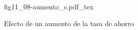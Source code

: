 \begin{figure}[h]
\centering
\def\svgwidth{0.5\textwidth}
{fig11_08-aumento_s.pdf_tex}
\caption{Efecto de un aumento de la tasa de ahorro}
\label{fig11_08-aumento_s}
\end{figure}